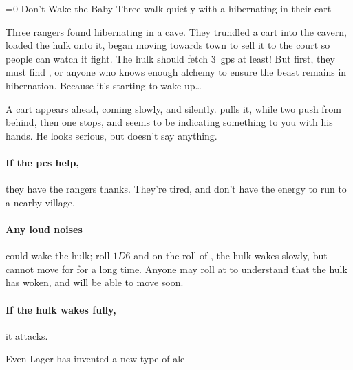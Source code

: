 \ifnum\value{temperature}=0
  {Don't Wake the Baby}%
  {Three  walk quietly with a hibernating  in their cart}%

  Three \glspl{ranger} found  hibernating in a cave.
  They trundled a cart into the cavern, loaded the \gls{hulk} onto it, began moving towards town to sell it to the \gls{court} so people can watch it fight.
  The \gls{hulk} should fetch 3~\glspl{gp} at least!
  But first, they must find , or anyone who knows enough \gls{alchemy} to ensure the beast remains in hibernation.
  Because it's starting to wake up\ldots

  \begin{boxtext}
    A cart appears ahead, coming slowly, and silently.
     pulls it, while two push from behind, then one stops, and seems to be indicating something to you with his hands.
    He looks serious, but doesn't say anything.
  \end{boxtext}

  \paragraph{If the \glspl{pc} help,}
  they have the \glspl{ranger} thanks.
  They're tired, and don't have the energy to run to a nearby \gls{village}.


  \paragraph{Any loud noises}
  could wake the \gls{hulk}; roll $1D6$ and on the roll of , the \gls{hulk} wakes slowly, but cannot move for for a long time.
  Anyone may roll  at \tn[12] to understand that the \gls{hulk} has woken, and will be able to move soon.

  \paragraph{If the \gls{hulk} wakes fully,}
  it attacks.

  \umberhulk

\fi

{Even Lager}%
{ has invented a new type of ale}%

